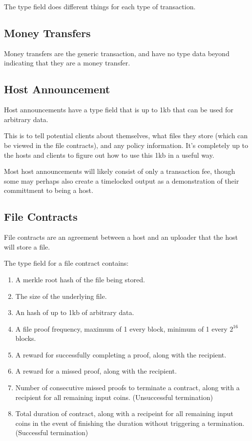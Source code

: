 \documentclass[twocolumn]{article}
\begin{document}
The type field does different things for each type of transaction.

\subsection{Money Transfers}
Money transfers are the generic transaction, and have no type data beyond indicating that they are a money transfer.

\subsection{Host Announcement}
Host announcements have a type field that is up to 1kb that can be used for arbitrary data.

This is to tell potential clients about themselves, what files they store (which can be viewed in the file contracts), and any policy information.
It's completely up to the hosts and clients to figure out how to use this 1kb in a useful way.

Most host announcements will likely consist of only a transaction fee, though some may perhaps also create a timelocked output as a demonstration of their committment to being a host.

\subsection{File Contracts}
File contracts are an agreement between a host and an uploader that the host will store a file.

The type field for a file contract contains:
\begin{enumerate}
	\item A merkle root hash of the file being stored.
	\item The size of the underlying file.
	\item An hash of up to 1kb of arbitrary data.
	\item A file proof frequency, maximum of 1 every block, minimum of 1 every $2^{16}$ blocks.
	\item A reward for successfully completing a proof, along with the recipient.
	\item A reward for a missed proof, along with the recipient.
	\item Number of consecutive missed proofs to terminate a contract, along with a recipient for all remaining input coins. (Unsuccessful termination)
	\item Total duration of contract, along with a recipeint for all remaining input coins in the event of finishing the duration without triggering a termination. (Successful termination)
\end{enumerate}
\end{document}
